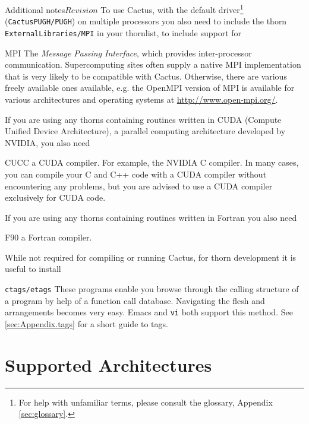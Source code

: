 \begin{cactuspart}{Additional notes}{}{$Revision$}
\noindent
To use Cactus, with the default driver\footnote{For help with unfamiliar terms,
please consult the glossary, Appendix \ref{sec:glossary}.}
(\texttt{CactusPUGH/PUGH}) on multiple
processors you also need to include the thorn \texttt{ExternalLibraries/MPI}
in your thornlist, to include support for
\begin{Lentry}
\item[MPI] The \textit{Message Passing Interface},
which provides inter-processor communication.
Supercomputing sites often supply a native MPI implementation
that is very likely to be compatible with Cactus. Otherwise, there are
various freely available ones available, e.g. the OpenMPI
version of MPI is available for various architectures and operating
systems at \url{http://www.open-mpi.org/}.
\end{Lentry}

\noindent
If you are using any thorns containing routines
written in CUDA (Compute Unified Device Architecture), a parallel 
computing architecture developed by NVIDIA, you also need
\begin{Lentry}
\item[CUCC] a CUDA compiler. For example, the NVIDIA C compiler. In many
cases, you can compile your C and C++ code with a CUDA compiler without 
encountering any problems, but you are advised to use a CUDA compiler exclusively
for CUDA code.
\end{Lentry}

\noindent
If you are using any thorns containing routines
written in Fortran you also need
\begin{Lentry}
\item[F90] a Fortran compiler.
\end{Lentry}

\noindent
While not required for compiling or running Cactus, for thorn development
it is useful to install
\begin{Lentry}
\item[\texttt{ctags/etags}] These programs enable you browse through the
  calling structure of a program by help of a function call database.
  Navigating the flesh and arrangements becomes very easy. Emacs and
  \texttt{vi} both support this method. See \ref{sec:Appendix.tags} for a short
  guide to tags.
\end{Lentry}


\section{Supported Architectures}
\label{sec:suar}


\end{cactuspart}
